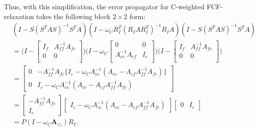 \documentclass[VANCOUVER,STIX1COL]{WileyNJD-v2}
\begin{document}
Thus, with this simplification, the error propagator for C-weighted FCF-relaxation takes
the following block $2 \times 2$ form:
\begin{subequations}
\begin{align} \label{eq:error propagator}
&(I-S(S^TAS)^{-1}S^TA)(I-\omega_C R^T_I(R_IAR^T_I)^{-1}R_IA)(I- S(S^TAS)^{-1}S^TA)\\%
& = \Bigg(I - \begin{bmatrix}
I_f & A_{ff}^{-1}A_{fc} \\
0 & 0\\
\end{bmatrix}\Bigg)
\Bigg(I - \omega_C \begin{bmatrix}
0 & 0 \\
A_{cc}^{-1}A_{cf} & I_c\\
\end{bmatrix}\Bigg)
\Bigg(I - \begin{bmatrix}
I_f & A_{ff}^{-1}A_{fc} \\
0 & 0\\
\end{bmatrix}\Bigg)\\%
& = \begin{bmatrix}
0 & -A_{ff}^{-1}A_{fc} \{I_c - \omega_C A_{cc}^{-1}(A_{cc} - A_{cf}A_{ff}^{-1}A_{fc})\}\\
0 & I_c - \omega_C A_{cc}^{-1} (A_{cc} - A_{cf}A_{ff}^{-1}A_{fc})
\end{bmatrix}\\
& = \begin{bmatrix}
- A_{ff}^{-1}A_{fc}\\
I_c
\end{bmatrix}
\begin{bmatrix}
I_c - \omega_C A_{cc}^{-1} (A_{cc} - A_{cf}A_{ff}^{-1}A_{fc})
\end{bmatrix}
\begin{bmatrix}
0 & I_c
\end{bmatrix}\\
& = P(I - \omega_C \mathbf{A}_{\triangle})R_I.
\label{eq:wFCF}
\end{align}
\end{subequations}
\end{document}
